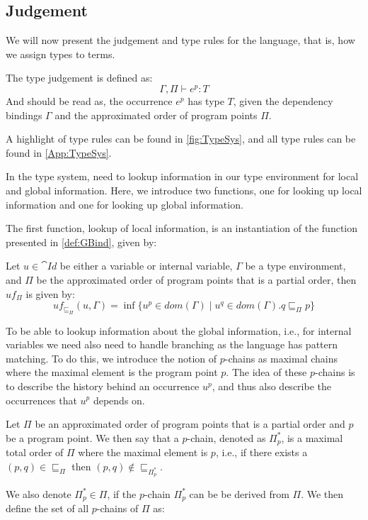 \documentclass[../../master.tex]{subfiles}
\begin{document}
\subsection{Judgement}\label{sec:Judge}
We will now present the judgement and type rules for the language, that is, how we assign types to terms.

The type judgement is defined as:
$$\Gamma,\Pi\vdash e^p: T$$
And should be read as, the occurrence $e^p$ has type $T$, given the dependency bindings $\Gamma$ and the approximated order of program points $\Pi$.

A highlight of type rules can be found in \cref{fig:TypeSys}, and all type rules can be found in \cref{App:TypeSys}.

In the type system, need to lookup information in our type environment for local and global information.
Here, we introduce two functions, one for looking up local information and one for looking up global information.

The first function, lookup of local information, is an instantiation of the function presented in \cref{def:GBind}, given by:
\begin{definition}[]
	Let $u\in \cat{Id}$ be either a variable or internal variable, $\Gamma$ be a type environment, and $\Pi$ be the approximated order of program points that is a partial order, then $uf_\Pi$ is given by:
	$$uf_{\sqsubseteq_\Pi}(u,\Gamma)=\inf\{u^p\in dom(\Gamma)\mid u^q\in dom(\Gamma).q\sqsubseteq_\Pi p\}$$
\end{definition}

To be able to lookup information about the global information, i.e., for internal variables we need also need to handle branching as the language has pattern matching.
To do this, we introduce the notion of $p$-chains as maximal chains where the maximal element is the program point $p$.
The idea of these $p$-chains is to describe the history behind an occurrence $u^p$, and thus also describe the occurrences that $u^p$ depends on.

\begin{definition}[$p$-chains]
	Let $\Pi$ be an approximated order of program points that is a partial order and $p$ be a program point.
	We then say that a $p$-chain, denoted as $\Pi_p^{*}$, is a maximal total order of $\Pi$ where the maximal element is $p$, i.e., if there exists a $(p,q)\in\sqsubseteq_\Pi$ then $(p,q)\notin\sqsubseteq_{\Pi_p^{*}}$.
\end{definition}

We also denote $\Pi_p^{*}\in\Pi$, if the $p$-chain $\Pi_p^{*}$ can be be derived from $\Pi$.
We then define the set of all $p$-chains of $\Pi$ as:
\end{document}
